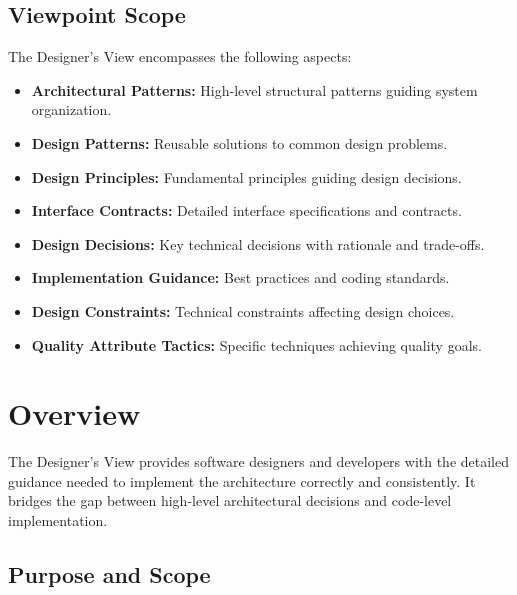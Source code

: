 \documentclass[11pt,letterpaper]{article}
\begin{document}
\subsection{Viewpoint Scope}

The Designer's View encompasses the following aspects:

\begin{itemize}
    \item \textbf{Architectural Patterns:} High-level structural patterns guiding system organization.
    
    \item \textbf{Design Patterns:} Reusable solutions to common design problems.
    
    \item \textbf{Design Principles:} Fundamental principles guiding design decisions.
    
    \item \textbf{Interface Contracts:} Detailed interface specifications and contracts.
    
    \item \textbf{Design Decisions:} Key technical decisions with rationale and trade-offs.
    
    \item \textbf{Implementation Guidance:} Best practices and coding standards.
    
    \item \textbf{Design Constraints:} Technical constraints affecting design choices.
    
    \item \textbf{Quality Attribute Tactics:} Specific techniques achieving quality goals.
\end{itemize}

\section{Overview}

The Designer's View provides software designers and developers with the detailed guidance needed to implement the architecture correctly and consistently. It bridges the gap between high-level architectural decisions and code-level implementation.

\subsection{Purpose and Scope}
\end{document}
